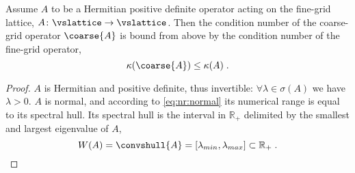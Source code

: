 \begin{theorem} \label{thm:cond:hpd}
Assume $A$ to be a Hermitian positive definite operator acting on the fine-grid lattice, $A \colon \vslattice \rightarrow \vslattice$. Then the condition number of the coarse-grid operator $\coarse{A}$ is bound from above by the condition number of the fine-grid operator,
\begin{equation}
\kappa(\coarse{A}) \leq \kappa(A) \;.
\end{equation}
\end{theorem}

\begin{proof}
$A$ is Hermitian and positive definite, thus invertible: $\forall \lambda \in \sigma(A)$ we have $\lambda > 0$.
$A$ is normal, and according to \cref{eq:nr:normal} its numerical range is equal to its spectral hull.
Its spectral hull is the interval in $\mathbb{R}_+$ delimited by the smallest and largest eigenvalue of $A$, \ie
\begin{equation}
W(A) = \convshull{A} = [ \lambda_{min}, \lambda_{max} ] \subset \mathbb{R}_+ \;.
\end{equation}

\end{proof}
